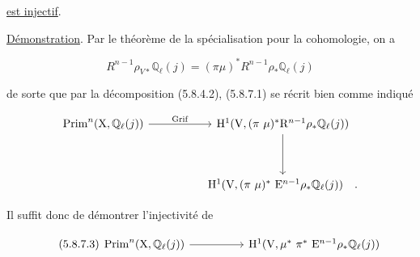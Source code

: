 \underline{est injectif}.

\underline{Démonstration}. Par le théorème de la spécialisation pour la cohomologie, on a

\begin{equation*}
R^{n-1}\rho_{V*}\mathbb{Q}_\ell(j) = (\pi\mu)^*R^{n-1}\rho_*\mathbb{Q}_\ell(j)
\end{equation*}



%
%
de sorte que par la décomposition (5.8.4.2), (5.8.7.1) se récrit bien comme indiqué

\begin{equation*}
\begin{tikzcd}[column sep=huge, row sep=huge]
\mathrm{Prim}^n(\mathrm{X},\mathbb{Q}_\ell(j)) \arrow[r, "\mathrm{Grif}"] & \mathrm{H}^1(\mathrm{V},(\pi\ \mu)^*\mathrm{R}^{n-1}\rho_*\mathbb{Q}_\ell(j)) \arrow[d] \\
{} & \mathrm{H}^1(\mathrm{V},(\pi\ \mu)^* \ \mathrm{E}^{n-1}\rho_*\mathbb{Q}_\ell(j)) \quad .
\end{tikzcd}
\end{equation*}

Il suffit donc de démontrer l'injectivité de

\begin{equation}\tag{5.8.7.3}
\begin{tikzcd}[column sep=huge]
\mathrm{Prim}^n(\mathrm{X},\mathbb{Q}_\ell(j)) \arrow[r] & \mathrm{H}^1(\mathrm{V},\mu^* \ \pi^* \ \mathrm{E}^{n-1}\rho_*\mathbb{Q}_\ell(j))
\end{tikzcd}
\end{equation}


